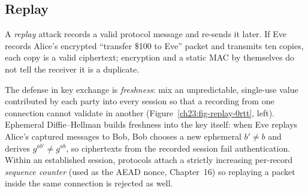 \subsection{Replay}

A \emph{replay} attack records a valid protocol message and re-sends it later.
If Eve records Alice's encrypted ``transfer \$100 to Eve'' packet and transmits
ten copies, each copy is a valid ciphertext; encryption and a static MAC by
themselves do not tell the receiver it is a duplicate.

The defense in key exchange is \emph{freshness}: mix an unpredictable,
single-use value contributed by each party into every session so that a
recording from one connection cannot validate in another
(Figure~\ref{ch23:fig-replay-0rtt}, left). Ephemeral Diffie--Hellman builds
freshness into the key itself: when Eve replays Alice's captured messages to
Bob, Bob chooses a new ephemeral $b' \neq b$ and derives $g^{ab'} \neq g^{ab}$,
so ciphertexts from the recorded session fail authentication. Within an
established session, protocols attach a strictly increasing per-record
\emph{sequence counter} (used as the AEAD nonce, Chapter~16) so replaying a
packet inside the same connection is rejected as well.

